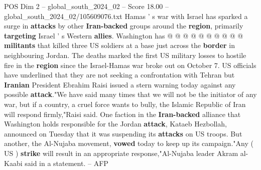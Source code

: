 \begin{textsample}{POS Dim 2 – global\_south\_2024\_02 – Score 18.00 – global\_south\_2024\_02/105609076.txt}
Hamas ' s war with Israel has sparked a surge in \textbf{attacks} by other \textbf{Iran-backed} groups around the \textbf{region}, primarily \textbf{targeting} Israel ' s Western \textbf{allies}.
Washington has @ @ @ @ @ @ @ @ @ @ \textbf{militants} that killed three US soldiers at a base just across the \textbf{border} in neighbouring Jordan.
The deaths marked the first US military losses to hostile fire in the \textbf{region} since the Israel-Hamas war broke out on October 7.
US officials have underlined that they are not seeking a confrontation with Tehran but \textbf{Iranian} President Ebrahim Raisi issued a stern warning today against any possible \textbf{attack}."We have said many times that we will not be the initiator of any war, but if a country, a cruel force wants to bully, the Islamic Republic of Iran will respond firmly,"Raisi said.
One faction in the \textbf{Iran-backed} alliance that Washington holds responsible for the Jordan \textbf{attack}, Kataeb Hezbollah, announced on Tuesday that it was suspending its \textbf{attacks} on US troops.
But another, the Al-Nujaba movement, \textbf{vowed} today to keep up its campaign."Any ( US ) \textbf{strike} will result in an appropriate response,"Al-Nujaba leader Akram al-Kaabi said in a statement. -- AFP

\end{textsample}
